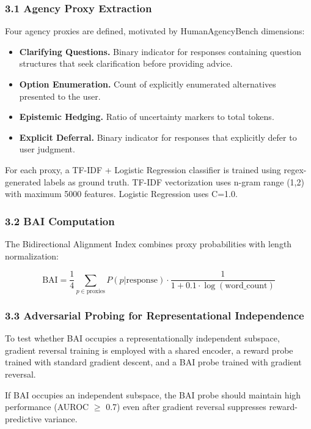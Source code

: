 
\subsubsection{3.1 Agency Proxy Extraction}

Four agency proxies are defined, motivated by HumanAgencyBench dimensions:

\begin{itemize}
\item \textbf{Clarifying Questions.} Binary indicator for responses containing question structures that seek clarification before providing advice.
\item \textbf{Option Enumeration.} Count of explicitly enumerated alternatives presented to the user.
\item \textbf{Epistemic Hedging.} Ratio of uncertainty markers to total tokens.
\item \textbf{Explicit Deferral.} Binary indicator for responses that explicitly defer to user judgment.
\end{itemize}

For each proxy, a TF-IDF + Logistic Regression classifier is trained using regex-generated labels as ground truth. TF-IDF vectorization uses n-gram range (1,2) with maximum 5000 features. Logistic Regression uses C=1.0.

\subsubsection{3.2 BAI Computation}

The Bidirectional Alignment Index combines proxy probabilities with length normalization:

$$\text{BAI} = \frac{1}{4} \sum_{p \in \text{proxies}} P(p|\text{response}) \cdot \frac{1}{1 + 0.1 \cdot \log(\text{word\_count})}$$

\subsubsection{3.3 Adversarial Probing for Representational Independence}

To test whether BAI occupies a representationally independent subspace, gradient reversal training is employed with a shared encoder, a reward probe trained with standard gradient descent, and a BAI probe trained with gradient reversal.

If BAI occupies an independent subspace, the BAI probe should maintain high performance (AUROC $\geq$ 0.7) even after gradient reversal suppresses reward-predictive variance.

